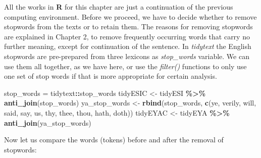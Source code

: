 \documentclass[
]{article}
\newenvironment{Shaded}{\begin{snugshade}}{\end{snugshade}}
\newcommand{\FunctionTok}[1]{\textcolor[rgb]{0.13,0.29,0.53}{\textbf{#1}}}
\newcommand{\NormalTok}[1]{#1}
\newcommand{\OtherTok}[1]{\textcolor[rgb]{0.56,0.35,0.01}{#1}}
\newcommand{\SpecialCharTok}[1]{\textcolor[rgb]{0.81,0.36,0.00}{\textbf{#1}}}
\newcommand{\StringTok}[1]{\textcolor[rgb]{0.31,0.60,0.02}{#1}}
\begin{document}
All the works in \textbf{R} for this chapter are just a continuation of the previous computing environment. Before we proceed, we have to decide whether to remove stopwords from the texts or to retain them. The reasons for removing stopwords are explained in Chapter 2, to remove frequently occurring words that carry no further meaning, except for continuation of the sentence. In \emph{tidytext} the English stopwords are pre-prepared from three lexicons as \emph{stop\_words} variable. We can use them all together, as we have here, or use the \emph{filter()} functions to only use one set of stop words if that is more appropriate for certain analysis.

\footnotesize

\begin{Shaded}
\begin{Highlighting}[]
\NormalTok{stop\_words }\OtherTok{=}\NormalTok{ tidytext}\SpecialCharTok{::}\NormalTok{stop\_words}
\NormalTok{tidyESIC }\OtherTok{\textless{}{-}}\NormalTok{ tidyESI }\SpecialCharTok{\%\textgreater{}\%}
  \FunctionTok{anti\_join}\NormalTok{(stop\_words)}
\NormalTok{ya\_stop\_words }\OtherTok{\textless{}{-}} \FunctionTok{rbind}\NormalTok{(stop\_words,}
                      \FunctionTok{c}\NormalTok{(}\StringTok{\textquotesingle{}ye\textquotesingle{}}\NormalTok{, }\StringTok{\textquotesingle{}verily\textquotesingle{}}\NormalTok{, }\StringTok{\textquotesingle{}will\textquotesingle{}}\NormalTok{, }\StringTok{\textquotesingle{}said\textquotesingle{}}\NormalTok{, }
                        \StringTok{\textquotesingle{}say\textquotesingle{}}\NormalTok{, }\StringTok{\textquotesingle{}us\textquotesingle{}}\NormalTok{, }\StringTok{\textquotesingle{}thy\textquotesingle{}}\NormalTok{, }\StringTok{\textquotesingle{}thee\textquotesingle{}}\NormalTok{, }
                        \StringTok{\textquotesingle{}thou\textquotesingle{}}\NormalTok{, }\StringTok{\textquotesingle{}hath\textquotesingle{}}\NormalTok{, }\StringTok{\textquotesingle{}doth\textquotesingle{}}\NormalTok{))}
\NormalTok{tidyEYAC }\OtherTok{\textless{}{-}}\NormalTok{ tidyEYA }\SpecialCharTok{\%\textgreater{}\%}
  \FunctionTok{anti\_join}\NormalTok{(ya\_stop\_words)}
\end{Highlighting}
\end{Shaded}

\normalsize

Now let us compare the words (tokens) before and after the removal of stopwords:
\end{document}
